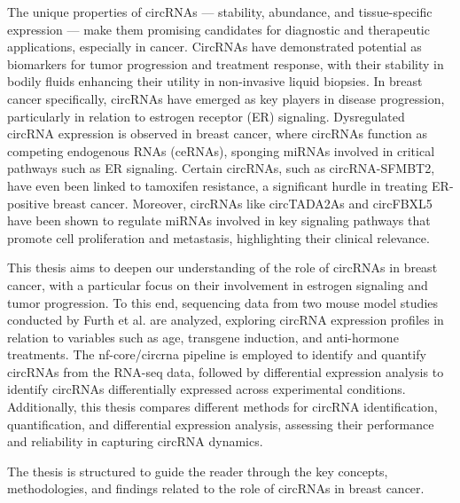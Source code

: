 The unique properties of circRNAs — stability, abundance, and tissue-specific
expression — make them promising candidates for diagnostic and therapeutic
applications, especially in cancer.
CircRNAs have demonstrated potential as biomarkers for tumor progression and
treatment response\supercite{bao_prognostic_2020,ren_construction_2017}, with
their stability in bodily fluids enhancing their utility in non-invasive liquid
biopsies\supercite{bao_prognostic_2020,zhang_circular_2018}.
In breast cancer specifically, circRNAs have emerged as key players in disease
progression, particularly in relation to estrogen receptor (ER) signaling.
Dysregulated circRNA expression is observed in breast cancer, where circRNAs
function as competing endogenous RNAs (ceRNAs), sponging miRNAs involved in
critical pathways such as ER
signaling\supercite{nair_circular_2016,xu_circrna_2022}.
Certain circRNAs, such as circRNA-SFMBT2, have even been linked to tamoxifen
resistance, a significant hurdle in treating ER-positive breast
cancer\supercite{li_circrna-sfmbt2_2023}.
Moreover, circRNAs like circTADA2As and circFBXL5 have been shown to regulate
miRNAs involved in key signaling pathways that promote cell proliferation and
metastasis, highlighting their clinical
relevance\supercite{xu_circtada2as_2019,gao_hsa_circrna_0006528_2019}.

This thesis aims to deepen our understanding of the role of circRNAs in breast
cancer, with a particular focus on their involvement in estrogen signaling and
tumor progression.
To this end, sequencing data from two mouse model studies conducted by Furth et
al.
\supercite{furth_esr1_2023,furth_overexpression_2023}
are analyzed, exploring circRNA expression profiles in relation to variables
such as age, transgene induction, and anti-hormone treatments.
The nf-core/circrna pipeline\supercite{digby_nf-corecircrna_2023} is employed
to identify and quantify circRNAs from the RNA-seq data, followed by
differential expression analysis to identify circRNAs differentially expressed
across experimental conditions.
Additionally, this thesis compares different methods for circRNA
identification, quantification, and differential expression analysis, assessing
their performance and reliability in capturing circRNA dynamics.

\medskip
\noindent The thesis is structured to guide the reader through the key concepts,
methodologies, and findings related to the role of circRNAs in breast cancer.

